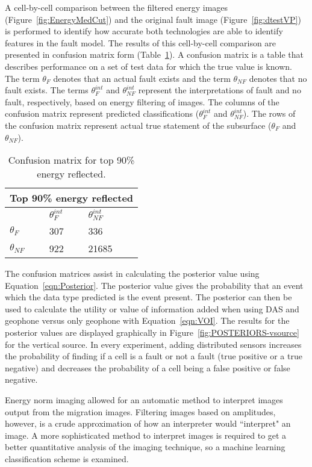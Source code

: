 A cell-by-cell comparison between the filtered energy images (Figure~\ref{fig:EnergyMedCut}) and the original fault image (Figure~\ref{fig:dtestVP}) is performed to identify how accurate both technologies are able to identify features in the fault model. The results of this cell-by-cell comparison are presented in confusion matrix form (Table~\ref{table:CONF}). A confusion matrix is a table that describes performance on a set of test data for which the true value is known. The term $\theta_F$ denotes that an actual fault exists and the term $\theta_{NF}$ denotes that no fault exists. The terms $\theta_F^{int}$ and $\theta_{NF}^{int}$ represent the interpretations of fault and no fault, respectively, based on energy filtering of images. The columns of the confusion matrix represent predicted classifications ($\theta_F^{int}$ and $\theta_{NF}^{int}$). The rows of the confusion matrix represent actual true statement of the subsurface ($\theta_F$ and $\theta_{NF}$).


\begin{table}[]
\centering
\caption{Confusion matrix for top 90\% energy reflected.}
\label{table:CONF}
\setlength{\tabcolsep}{1em}
\begin{tabular}{|l|l|l|}

   \multicolumn{3}{c}{Top 90\% energy reflected}\\
  \hline
            & $\theta_F^{int}$ & $\theta_{NF}^{int}$ \\
            \hline
 $\theta_F$ & 307 & 336 \\
\hline
 $\theta_{NF}$ & 922 & 21685 \\
\hline
\end{tabular}
\end{table}

The confusion matrices assist in calculating the posterior value using Equation~\ref{eqn:Posterior}. The posterior value gives the probability that an event which the data type predicted is the event present. The posterior can then be used to calculate the utility or value of information added when using DAS and geophone versus only geophone with Equation~\ref{eqn:VOI}. The results for the posterior values are displayed graphically in Figure~\ref{fig:POSTERIORS-vsource} for the vertical source. In every experiment, adding distributed sensors increases the probability of finding if a cell is a fault or not a fault (true positive or a true negative) and decreases the probability of a cell being a false positive or false negative.

Energy norm imaging allowed for an automatic method to interpret images output from the migration images. Filtering images based on amplitudes, however, is a crude approximation of how an interpreter would ``interpret" an image. A more sophisticated method to interpret images is required to get a better quantitative analysis of the imaging technique, so a machine learning classification scheme is examined.

